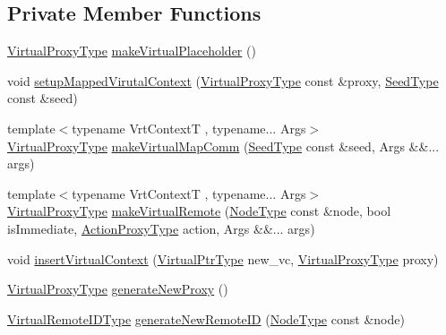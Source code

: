 \subsection*{Private Member Functions}
\begin{DoxyCompactItemize}
\item 
\hyperlink{namespacevt_a1b417dd5d684f045bb58a0ede70045ac}{Virtual\+Proxy\+Type} \hyperlink{structvt_1_1vrt_1_1_virtual_context_manager_ae3cb983e08d10e841b85782ada02967d}{make\+Virtual\+Placeholder} ()
\item 
void \hyperlink{structvt_1_1vrt_1_1_virtual_context_manager_a02630db1a09deb31e649a78846653f76}{setup\+Mapped\+Virutal\+Context} (\hyperlink{namespacevt_a1b417dd5d684f045bb58a0ede70045ac}{Virtual\+Proxy\+Type} const \&proxy, \hyperlink{namespacevt_ae2e13198bdef4d5b8e603d6c1c7f0969}{Seed\+Type} const \&seed)
\item 
{\footnotesize template$<$typename Vrt\+ContextT , typename... Args$>$ }\\\hyperlink{namespacevt_a1b417dd5d684f045bb58a0ede70045ac}{Virtual\+Proxy\+Type} \hyperlink{structvt_1_1vrt_1_1_virtual_context_manager_a37eee2956b5b17cae7e4fd6e51869cc0}{make\+Virtual\+Map\+Comm} (\hyperlink{namespacevt_ae2e13198bdef4d5b8e603d6c1c7f0969}{Seed\+Type} const \&seed, Args \&\&... args)
\item 
{\footnotesize template$<$typename Vrt\+ContextT , typename... Args$>$ }\\\hyperlink{namespacevt_a1b417dd5d684f045bb58a0ede70045ac}{Virtual\+Proxy\+Type} \hyperlink{structvt_1_1vrt_1_1_virtual_context_manager_a7236496fc6ffb6f4b9631a5024008178}{make\+Virtual\+Remote} (\hyperlink{namespacevt_a866da9d0efc19c0a1ce79e9e492f47e2}{Node\+Type} const \&node, bool is\+Immediate, \hyperlink{namespacevt_a102aa105d64254d89f7e585d106c95aa}{Action\+Proxy\+Type} action, Args \&\&... args)
\item 
void \hyperlink{structvt_1_1vrt_1_1_virtual_context_manager_a398fd80620aad8ff9ba5fa9964a661a6}{insert\+Virtual\+Context} (\hyperlink{structvt_1_1vrt_1_1_virtual_context_manager_a24dd2acbbd37a53f4e4108d385a58441}{Virtual\+Ptr\+Type} new\+\_\+vc, \hyperlink{namespacevt_a1b417dd5d684f045bb58a0ede70045ac}{Virtual\+Proxy\+Type} proxy)
\item 
\hyperlink{namespacevt_a1b417dd5d684f045bb58a0ede70045ac}{Virtual\+Proxy\+Type} \hyperlink{structvt_1_1vrt_1_1_virtual_context_manager_a9afc60815d2b382215f458e0aae9dc3f}{generate\+New\+Proxy} ()
\item 
\hyperlink{namespacevt_1_1vrt_a8184ab8c530ce523edcdc4f4c38565be}{Virtual\+Remote\+I\+D\+Type} \hyperlink{structvt_1_1vrt_1_1_virtual_context_manager_a9d5b94f32defc2e563ebf8ad54bb3164}{generate\+New\+Remote\+ID} (\hyperlink{namespacevt_a866da9d0efc19c0a1ce79e9e492f47e2}{Node\+Type} const \&node)

\end{DoxyCompactItemize}
